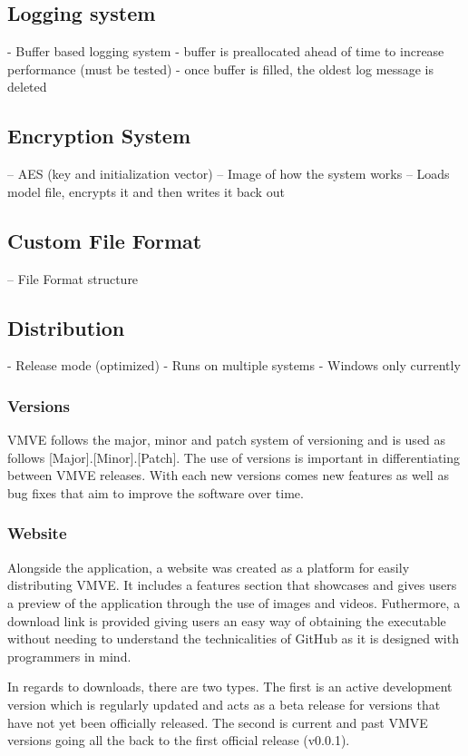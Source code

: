 \documentclass[11pt]{article}
\begin{document}
\subsection{Logging system}
- Buffer based logging system
- buffer is preallocated ahead of time to increase performance (must be tested)
- once buffer is filled, the oldest log message is deleted

\subsection{Encryption System}
-- AES (key and initialization vector)
-- Image of how the system works 
  -- Loads model file, encrypts it and then writes it back out


\subsection{Custom File Format}
-- File Format structure



\subsection{Distribution}
- Release mode (optimized)
- Runs on multiple systems
- Windows only currently

\subsubsection{Versions}
VMVE follows the major, minor and patch system of versioning and is used as
follows [Major].[Minor].[Patch]. The use of versions is important in
differentiating between VMVE releases. With each new versions comes new features
as well as bug fixes that aim to improve the software over time. 

\subsubsection{Website}
Alongside the application, a website was created as a platform for easily distributing VMVE.
It includes a features section that showcases and gives users a preview of the application
through the use of images and videos. Futhermore, a download link is provided
giving users an easy way of obtaining the executable without needing to
understand the technicalities of GitHub as it is designed with programmers in mind.

In regards to downloads, there are two types. The first is an active development
version which is regularly updated and acts as a beta release for versions that
have not yet been officially released. The second is current and past VMVE versions
going all the back to the first official release (v0.0.1).
\end{document}
